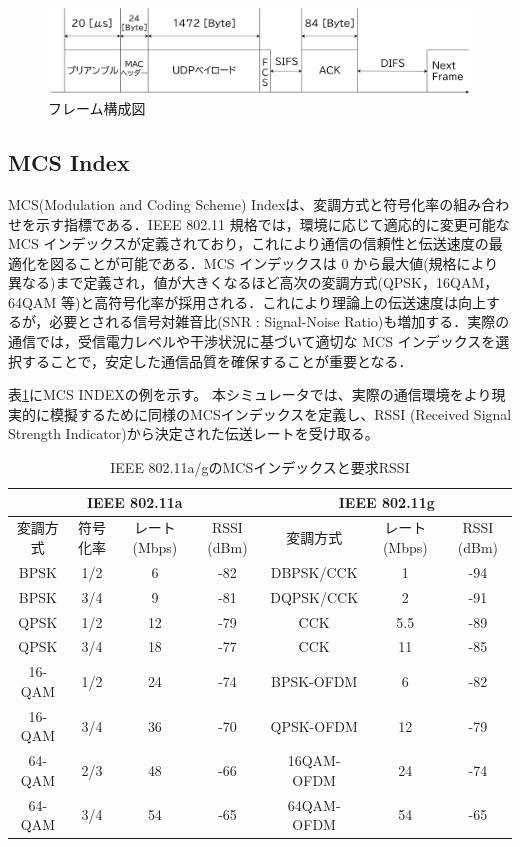 \documentclass[a4paper,10pt]{ltjsarticle}
\begin{document}
\begin{figure}[H]
  \centering
  \includegraphics[width=1\columnwidth]{./assets/packet.png}
  \caption{フレーム構成図}
  \label{packet}
\end{figure}

\clearpage

\subsection{MCS Index}
MCS(Modulation and Coding Scheme) Indexは、変調方式と符号化率の組み合わせを示す指標である．IEEE 802.11 規格では，環境に応じて適応的に変更可能な MCS インデックスが定義されており，これにより通信の信頼性と伝送速度の最適化を図ることが可能である．MCS インデックスは 0 から最大値(規格により異なる)まで定義され，値が大きくなるほど高次の変調方式(QPSK，16QAM，64QAM 等)と高符号化率が採用される．これにより理論上の伝送速度は向上するが，必要とされる信号対雑音比(SNR : Signal-Noise Ratio)も増加する．実際の通信では，受信電力レベルや干渉状況に基づいて適切な MCS インデックスを選択することで，安定した通信品質を確保することが重要となる．

表\ref{table:mcs_11abg_rssi}にMCS INDEXの例を示す。
本シミュレータでは、実際の通信環境をより現実的に模擬するために同様のMCSインデックスを定義し、RSSI (Received Signal Strength Indicator)から決定された伝送レートを受け取る。\\


\begin{table}[H]
  \centering
  \caption{IEEE 802.11a/gのMCSインデックスと要求RSSI}
  \label{table:mcs_11abg_rssi}
  \begin{tabular}{c|c|c|c|c|c|c}
      \hline
      \multicolumn{4}{c|}{IEEE 802.11a} & \multicolumn{3}{c}{IEEE 802.11g} \\
      \hline
      変調方式 & 符号化率 & レート (Mbps) & RSSI (dBm) & 変調方式 & レート (Mbps) & RSSI (dBm) \\
      \hline
      BPSK & 1/2 & 6 & -82 & DBPSK/CCK & 1 & -94 \\
      BPSK & 3/4 & 9 & -81 & DQPSK/CCK & 2 & -91 \\
      QPSK & 1/2 & 12 & -79 & CCK & 5.5 & -89 \\
      QPSK & 3/4 & 18 & -77 & CCK & 11 & -85 \\
      16-QAM & 1/2 & 24 & -74 & BPSK-OFDM & 6 & -82 \\
      16-QAM & 3/4 & 36 & -70 & QPSK-OFDM & 12 & -79 \\
      64-QAM & 2/3 & 48 & -66 & 16QAM-OFDM & 24 & -74 \\
      64-QAM & 3/4 & 54 & -65 & 64QAM-OFDM & 54 & -65 \\
      \hline
  \end{tabular}
\end{table}
\end{document}
